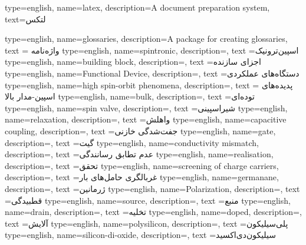{
    type=english,
    name={latex},
    description={A document preparation system},
    text={لتکس}
}

{
    type=english,
    name={glossaries},
    description={A package for creating glossaries},
    text = {واژه‌نامه}
}
{
    type=english,
    name={spintronic},
    description={},
    text ={اسپین‌ترونیک}
}
{
    type=english,
    name={building block},
    description={},
    text ={اجزای سازنده}
}
{
    type=english,
    name={Functional Device},
    description={},
    text ={دستگاه‌های عملکردی}
}
{
    type=english,
    name={high spin-orbit phenomena},
    description={},
    text ={ پدیده‌های اسپین-مدار بالا}
}
{
    type=english,
    name={bulk},
    description={},
    text ={توده‌ای}
}
{
    type=english,
    name={spin valve},
    description={},
    text ={شیر‌اسپینی}
}
{
    type=english,
    name={relaxation},
    description={},
    text ={واهلش}
}
{
    type=english,
    name={capacitive coupling},
    description={},
    text ={جفت‌شدگی خازنی}
}
{
    type=english,
    name={gate},
    description={},
    text ={گیت}
}
{
    type=english,
    name={conductivity mismatch},
    description={},
    text ={عدم تطابق رسانندگی}
}
{
    type=english,
    name={realisation},
    description={},
    text ={تحقق}
}
{
    type=english,
    name={screening of charge carriers},
    description={},
    text ={غربالگری حامل‌های بار}
}
{
    type=english,
    name={germanane},
    description={},
    text ={ژرمانین}
}
{
    type=english,
    name={Polarization},
    description={},
    text ={قطبیدگی}
}
{
    type=english,
    name={source},
    description={},
    text ={منبع}
}
{
    type=english,
    name={drain},
    description={},
    text ={تخلیه}
}
{
    type=english,
    name={doped},
    description={},
    text ={آلایش}
}
{
    type=english,
    name={polysilicon},
    description={},
    text ={پلی‌سیلیکون}
}
{
    type=english,
    name={silicon-di-oxide},
    description={},
    text ={سیلیکون‌دی‌اکسید}
}

